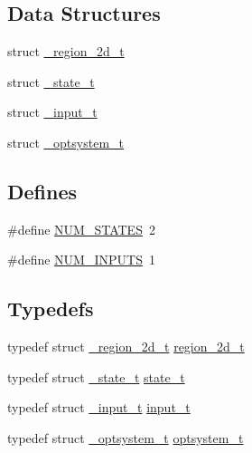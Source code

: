 \subsection*{\-Data \-Structures}
\begin{DoxyCompactItemize}
\item 
struct \hyperlink{a00006}{\-\_\-region\-\_\-2d\-\_\-t}
\item 
struct \hyperlink{a00007}{\-\_\-state\-\_\-t}
\item 
struct \hyperlink{a00002}{\-\_\-input\-\_\-t}
\item 
struct \hyperlink{a00004}{\-\_\-optsystem\-\_\-t}
\end{DoxyCompactItemize}
\subsection*{\-Defines}
\begin{DoxyCompactItemize}
\item 
\#define \hyperlink{a00018_a6e67a587012cd0570839daca590cf822_a6e67a587012cd0570839daca590cf822}{\-N\-U\-M\-\_\-\-S\-T\-A\-T\-E\-S}~2
\item 
\#define \hyperlink{a00018_ad706a4e66dccbe66985b4c8785f28f3c_ad706a4e66dccbe66985b4c8785f28f3c}{\-N\-U\-M\-\_\-\-I\-N\-P\-U\-T\-S}~1
\end{DoxyCompactItemize}
\subsection*{\-Typedefs}
\begin{DoxyCompactItemize}
\item 
typedef struct \hyperlink{a00006}{\-\_\-region\-\_\-2d\-\_\-t} \hyperlink{a00018_a9136102e25aac8406a94d89f5a95bd1f_a9136102e25aac8406a94d89f5a95bd1f}{region\-\_\-2d\-\_\-t}
\item 
typedef struct \hyperlink{a00007}{\-\_\-state\-\_\-t} \hyperlink{a00018_a1c9d0bb39483d4981491e6383b0dbb47_a1c9d0bb39483d4981491e6383b0dbb47}{state\-\_\-t}
\item 
typedef struct \hyperlink{a00002}{\-\_\-input\-\_\-t} \hyperlink{a00018_a8e5c489dcfacb9bd5f2985013638ea12_a8e5c489dcfacb9bd5f2985013638ea12}{input\-\_\-t}
\item 
typedef struct \hyperlink{a00004}{\-\_\-optsystem\-\_\-t} \hyperlink{a00018_a48d08bbb4534f55ba817743a2b91360c_a48d08bbb4534f55ba817743a2b91360c}{optsystem\-\_\-t}
\end{DoxyCompactItemize}
